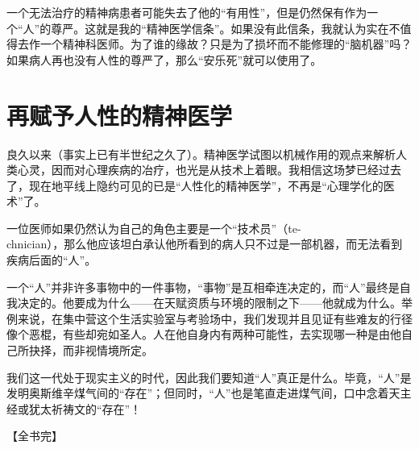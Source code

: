 \documentclass[11pt,oneside]{book}
\begin{document}
\begin{common-format}
一个无法治疗的精神病患者可能失去了他的“有用性”，但是仍然保有作为一个“人”的尊严。这就是我的“精神医学信条”。如果没有此信条，我就认为实在不值得去作一个精神科医师。为了谁的缘故？只是为了损坏而不能修理的“脑机器”吗？如果病人再也没有人性的尊严了，那么“安乐死”就可以使用了。


\section{再赋予人性的精神医学} 
良久以来（事实上已有半世纪之久了）。精神医学试图以机械作用的观点来解析人类心灵，因而对心理疾病的冶疗，也光是从技术上着眼。我相信这场梦已经过去了，现在地平线上隐约可见的已是“人性化的精神医学”，不再是“心理学化的医术”了。

一位医师如果仍然认为自己的角色主要是一个“技术员”（te-\\chnician），那么他应该坦白承认他所看到的病人只不过是一部机器，而无法看到疾病后面的“人”。

一个“人”并非许多事物中的一件事物，“事物”是互相牵连决定的，而“人”最终是自我决定的。他要成为什么——在天赋资质与环境的限制之下——他就成为什么。举例来说，在集中营这个生活实验室与考验场中，我们发现并且见证有些难友的行径像个恶棍，有些却宛如圣人。人在他自身内有两种可能性，去实现哪一种是由他自己所抉择，而非视情境所定。

我们这一代处于现实主义的时代，因此我们要知道“人”真正是什么。毕竟，“人”是发明奥斯维辛煤气间的“存在”；但同时，“人”也是笔直走进煤气间，口中念着天主经或犹太祈祷文的“存在”！

【全书完】





\end{common-format}  
\end{document}
